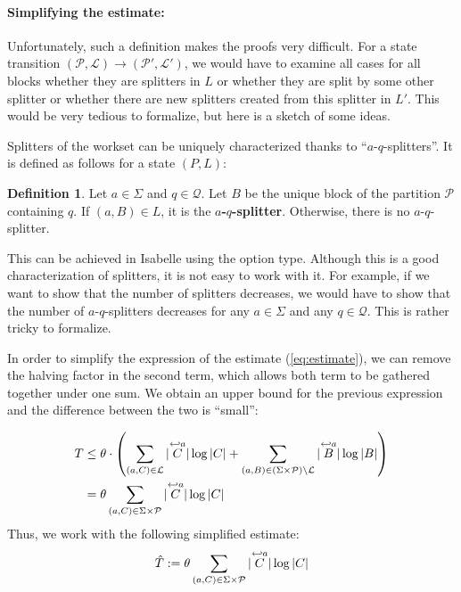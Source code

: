 \documentclass[12pt, a4 paper]{article}
\theoremstyle{definition}
\newtheorem{definition}{Definition}
\begin{document}
\paragraph{Simplifying the estimate:}
Unfortunately, such a definition makes the proofs very difficult. For a state transition $(\mathcal{P}, \mathcal{L}) \rightarrow (\mathcal{P}', \mathcal{L}')$, we would have to examine all cases for all blocks whether they are splitters in $L$ or whether they are split by some other splitter or whether there are new splitters created from this splitter in $L'$. This would be very tedious to formalize, but here is a sketch of some ideas.

Splitters of the workset can be uniquely characterized thanks to ``$a$-$q$-splitters''. It is defined as follows for a state $(P, L)$:

\begin{definition}
Let $a \in \Sigma$ and $q \in \mathcal{Q}$. Let $B$ be the unique block of the partition $\mathcal{P}$ containing $q$. If $(a, B) \in L$, it is the \textbf{$a$-$q$-splitter}. Otherwise, there is no $a$-$q$-splitter.
\end{definition}

This can be achieved in Isabelle using the option type. Although this is a good characterization of splitters, it is not easy to work with it. For example, if we want to show that the number of splitters decreases, we would have to show that the number of $a$-$q$-splitters decreases for any $a \in \Sigma$ and any $q \in \mathcal{Q}$. This is rather tricky to formalize.

\bigskip

In order to simplify the expression of the estimate (\ref{eq:estimate}), we can remove the halving factor in the second term, which allows both term to be gathered together under one sum. We obtain an upper bound for the previous expression and the difference between the two is ``small'':

\begin{align*}
    T & \leq \theta \cdot \left(\sum_{(a, C) \in \mathcal{L}} | \overset{\hookleftarrow {a}}{C} | \log | C | + \sum_{(a, B) \in (\Sigma\times \mathcal{P})\setminus \mathcal{L}} | \overset{\hookleftarrow {a}}{B} | \log | B | \right)\\
    & = \theta \sum_{(a, C) \in \Sigma\times \mathcal{P}} | \overset{\hookleftarrow {a}}{C} | \log | C |
\end{align*}
Thus, we work with the following simplified estimate:
\begin{equation}\label{eq:estimate_simplified}
    \hat{T} := \theta \sum_{(a, C) \in \Sigma\times \mathcal{P}} | \overset{\hookleftarrow {a}}{C} | \log | C |
\end{equation}
\end{document}
